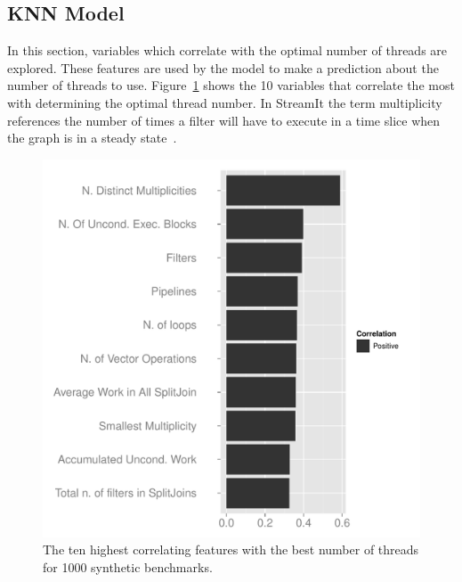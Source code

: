 \subsection{KNN Model}
In this section, variables which correlate with the optimal number of threads are explored.
These features are used by the model to make a prediction about the number of threads to use.
Figure~\ref{fig:corr} shows the 10 variables that correlate the most with determining the optimal thread number.
In StreamIt the term multiplicity references the number of times a filter will have to execute in a time slice when the graph is in a steady state~\cite{gordon2002streamcomp}.

\begin{figure}
  \includegraphics[width=1\textwidth]{streamit-paper/graphics/corrGraph.pdf}
  \caption{The ten highest correlating features with the best number of threads for 1000 synthetic benchmarks.}\label{fig:corr}
\end{figure}
 
